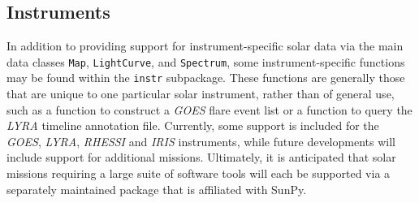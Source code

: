 \subsection{Instruments}\label{ssec:util:inst}
In addition to providing support for instrument-specific solar data via the main data 
classes \texttt{Map}, \texttt{LightCurve}, and \texttt{Spectrum}, 
some instrument-specific functions may be found within the \texttt{instr} subpackage. 
These functions are generally those that are unique to one particular solar instrument, 
rather than of general use, such as a function to construct a \textit{GOES} flare event list 
or a function to query the \textit{LYRA} timeline annotation file. Currently, some support is included
for the \textit{GOES}, \textit{LYRA}, \textit{RHESSI} and \textit{IRIS} instruments, while future developments 
will include support for additional missions. Ultimately, it is anticipated that solar
missions requiring a large suite of software tools will each be supported via a separately 
maintained package that is affiliated with SunPy.

